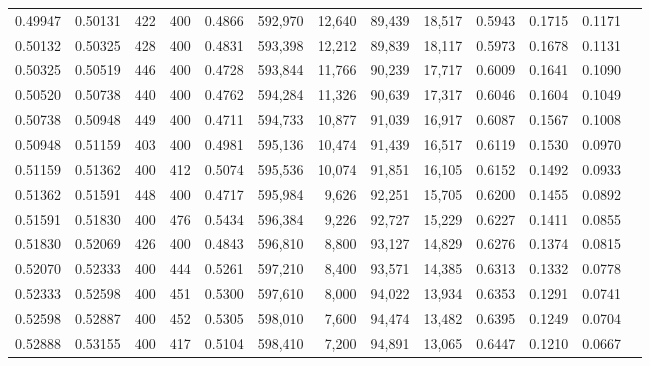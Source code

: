 \begin{tabular}{rrrrrrrrrrrrr}
0.49947 & 0.50131 &    422 &   400 &                                     0.4866 & 592,970 &  12,640 &  89,439 &  18,517 & 0.5943 & 0.1715 & 0.1171 \\
0.50132 & 0.50325 &    428 &   400 &                                     0.4831 & 593,398 &  12,212 &  89,839 &  18,117 & 0.5973 & 0.1678 & 0.1131 \\
0.50325 & 0.50519 &    446 &   400 &                                     0.4728 & 593,844 &  11,766 &  90,239 &  17,717 & 0.6009 & 0.1641 & 0.1090 \\
0.50520 & 0.50738 &    440 &   400 &                                     0.4762 & 594,284 &  11,326 &  90,639 &  17,317 & 0.6046 & 0.1604 & 0.1049 \\
0.50738 & 0.50948 &    449 &   400 &                                     0.4711 & 594,733 &  10,877 &  91,039 &  16,917 & 0.6087 & 0.1567 & 0.1008 \\
0.50948 & 0.51159 &    403 &   400 &                                     0.4981 & 595,136 &  10,474 &  91,439 &  16,517 & 0.6119 & 0.1530 & 0.0970 \\
0.51159 & 0.51362 &    400 &   412 &                                     0.5074 & 595,536 &  10,074 &  91,851 &  16,105 & 0.6152 & 0.1492 & 0.0933 \\
0.51362 & 0.51591 &    448 &   400 &                                     0.4717 & 595,984 &   9,626 &  92,251 &  15,705 & 0.6200 & 0.1455 & 0.0892 \\
0.51591 & 0.51830 &    400 &   476 &                                     0.5434 & 596,384 &   9,226 &  92,727 &  15,229 & 0.6227 & 0.1411 & 0.0855 \\
0.51830 & 0.52069 &    426 &   400 &                                     0.4843 & 596,810 &   8,800 &  93,127 &  14,829 & 0.6276 & 0.1374 & 0.0815 \\
0.52070 & 0.52333 &    400 &   444 &                                     0.5261 & 597,210 &   8,400 &  93,571 &  14,385 & 0.6313 & 0.1332 & 0.0778 \\
0.52333 & 0.52598 &    400 &   451 &                                     0.5300 & 597,610 &   8,000 &  94,022 &  13,934 & 0.6353 & 0.1291 & 0.0741 \\
0.52598 & 0.52887 &    400 &   452 &                                     0.5305 & 598,010 &   7,600 &  94,474 &  13,482 & 0.6395 & 0.1249 & 0.0704 \\
0.52888 & 0.53155 &    400 &   417 &                                     0.5104 & 598,410 &   7,200 &  94,891 &  13,065 & 0.6447 & 0.1210 & 0.0667 \\

\end{tabular}

